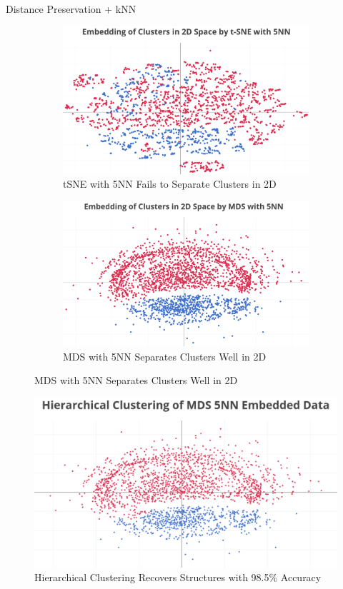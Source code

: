 \documentclass[final]{beamer}
\newlength{\onecolwid}
\begin{document}
\begin{frame}[t]
\begin{columns}[t]
\begin{column}{\onecolwid}
\begin{block}{Distance Preservation + kNN}
\begin{figure}[!ht]
\begin{subfigure}{.5\textwidth}
    \centering
    \includegraphics[width=.9\linewidth]{images/tSNE_5NN.png}
    \caption{tSNE with 5NN Fails to Separate Clusters in 2D}
\end{subfigure}%
\begin{subfigure}{.5\textwidth}
    \centering
    \includegraphics[width=.8\linewidth]{images/MDS_5NN.png}
    \caption{MDS with 5NN Separates Clusters Well in 2D}
\end{subfigure}
\end{figure}

\vspace{10mm}
\begin{figure}[!ht]
\includegraphics[width=0.9\linewidth]{images/AG_cluster.png}
\caption{Hierarchical Clustering Recovers Structures with 98.5\% Accuracy}
\end{figure}


\end{block}
\end{column}
\end{columns}
\end{frame}
\end{document}
